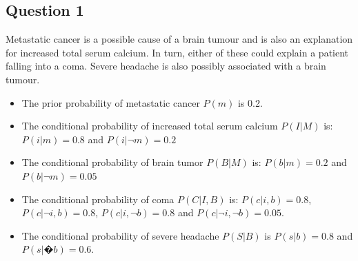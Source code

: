 \documentclass{article}
\begin{document}
\subsection{Question 1}

Metastatic cancer is a possible cause of a brain tumour and is also an explanation for increased total serum calcium. In turn, either of these could explain a patient falling into a coma. Severe headache is also possibly associated with a brain tumour. 

\begin{itemize}
\item The prior probability of metastatic cancer $P(m)$ is 0.2. 
\item The conditional probability of increased total serum calcium $P(I | M)$ is: $P(i | m) = 0.8$ and $P(i | \neg m) = 0.2$ 
\item The conditional probability of brain tumor $P(B | M)$ is: $P(b | m) = 0.2$ and $P(b | \neg m) = 0.05$ 
\item The conditional probability of coma $P(C | I, B)$ is: $P(c | i, b) = 0.8$, $P(c | \neg i, b) = 0.8$, $P(c | i, \neg b) = 0.8$ and $P(c | \neg i, \neg b) = 0.05$. 
\item The conditional probability of severe headache $P(S | B)$ is $P(s | b) = 0.8$ and $P(s | �b) = 0.6$.
\end{itemize} 
\end{document}
